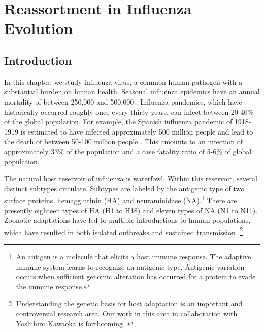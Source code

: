 
\chapter{Reassortment in Influenza Evolution}
\label{ch:influenza}

\section{Introduction}
\label{flu:introduction}

In this chapter, we study influenza virus, a common human pathogen with a substantial burden on human health.
Seasonal influenza epidemics have an annual mortality of between 250,000 and 500,000 \cite{WHO:2014b}.
Influenza pandemics, which have historically occurred roughly once every thirty years, can infect between 20-40\% of the global population.
For example, the Spanish influenza pandemic of 1918-1919 is estimated to have infected approximately 500 million people and lead to the death of between 50-100 million people \cite{Taubenberger:2006kl}.
This amounts to an infection of approximately 33\% of the population and a case fatality ratio of 5-6\% of global population.

The natural host reservoir of influenza is waterfowl.
Within this reservoir, several distinct subtypes circulate.
Subtypes are labeled by the antigenic type of two surface proteins, hemagglutinin (HA) and neuraminidase (NA).\footnote{An antigen is a molecule that elicits a host immune response. The adaptive immune system learns to recognize an antigenic type. Antigenic variation occurs when sufficient genomic alteration has occurred for a protein to evade the immune response.}
There are presently eighteen types of HA (H1 to H18) and eleven types of NA (N1 to N11).
Zoonotic adaptations have led to multiple introductions to human populations, which have resulted in both isolated outbreaks and sustained transmission \cite{Nelson:2007bc}.\footnote{Understanding the genetic basis for host adaptation is an important and controversial research area. Our work in this area in collaboration with Yoshihiro Kawaoka is forthcoming \cite{Walters:2016a}.}

